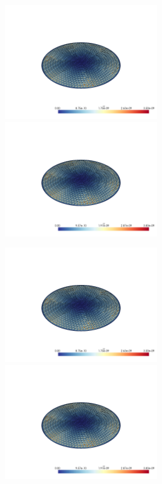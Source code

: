 \documentclass[
  11pt,
]{article}
\let\origfigure\figure
\let\endorigfigure\endfigure
\renewenvironment{figure}[1][2] {
    \expandafter\origfigure\expandafter[H]
} {
    \endorigfigure
}
\begin{document}
\begin{figure}
\caption{Finite element error in the L2 and H1 norms/seminorms, respectively for problem 1 over mesh number 4 using order 8 quadrature.}
\end{figure}

\includegraphics[width=0.5\textwidth,height=\textheight]{../img/mesh4-gauss13-b-L2.png}
\includegraphics[width=0.5\textwidth,height=\textheight]{../img/mesh4-gauss13-b-H1.png}

\begin{figure}
\caption{Finite element error in the L2 and H1 norms/seminorms, respectively for problem 1 over mesh number 4 using order 13 quadrature.}
\end{figure}

\includegraphics[width=0.5\textwidth,height=\textheight]{../img/mesh4-gauss19-b-L2.png}
\includegraphics[width=0.5\textwidth,height=\textheight]{../img/mesh4-gauss19-b-H1.png}
\end{document}
